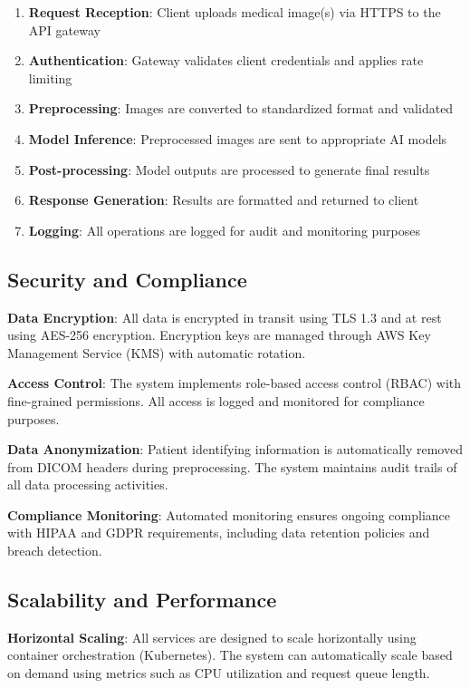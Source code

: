 \documentclass[12pt,a4paper]{article}
\begin{document}
\begin{enumerate}
    \item \textbf{Request Reception}: Client uploads medical image(s) via HTTPS to the API gateway
    \item \textbf{Authentication}: Gateway validates client credentials and applies rate limiting
    \item \textbf{Preprocessing}: Images are converted to standardized format and validated
    \item \textbf{Model Inference}: Preprocessed images are sent to appropriate AI models
    \item \textbf{Post-processing}: Model outputs are processed to generate final results
    \item \textbf{Response Generation}: Results are formatted and returned to client
    \item \textbf{Logging}: All operations are logged for audit and monitoring purposes
\end{enumerate}

\subsection{Security and Compliance}

\textbf{Data Encryption}: All data is encrypted in transit using TLS 1.3 and at rest using AES-256 encryption. Encryption keys are managed through AWS Key Management Service (KMS) with automatic rotation.

\textbf{Access Control}: The system implements role-based access control (RBAC) with fine-grained permissions. All access is logged and monitored for compliance purposes.

\textbf{Data Anonymization}: Patient identifying information is automatically removed from DICOM headers during preprocessing. The system maintains audit trails of all data processing activities.

\textbf{Compliance Monitoring}: Automated monitoring ensures ongoing compliance with HIPAA and GDPR requirements, including data retention policies and breach detection.

\subsection{Scalability and Performance}

\textbf{Horizontal Scaling}: All services are designed to scale horizontally using container orchestration (Kubernetes). The system can automatically scale based on demand using metrics such as CPU utilization and request queue length.
\end{document}
